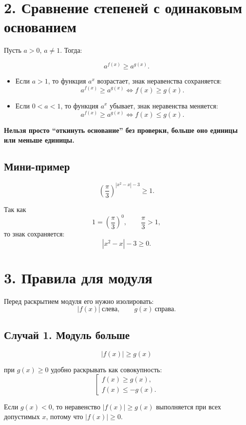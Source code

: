 \documentclass[a4paper,12pt]{article}
\newcommand{\sectionline}{\vspace{2mm}{\color{accent}\hrule height 0.6pt}\vspace{2mm}}
\newcommand{\important}[1]{\textcolor{darkaccent}{\textbf{#1}}}
\begin{document}
\section*{2. Сравнение степеней с одинаковым основанием}
\sectionline

Пусть \(a>0\), \(a\ne 1\). Тогда:

\[
a^{f(x)} \ge a^{g(x)}.
\]

\begin{itemize}
    \item Если \(a>1\), то функция \(a^x\) возрастает, знак неравенства сохраняется:
    \[
    a^{f(x)} \ge a^{g(x)} \Longleftrightarrow f(x)\ge g(x).
    \]
    \item Если \(0<a<1\), то функция \(a^x\) убывает, знак неравенства меняется:
    \[
    a^{f(x)} \ge a^{g(x)} \Longleftrightarrow f(x)\le g(x).
    \]
\end{itemize}

\important{Нельзя просто ``откинуть основание'' без проверки, больше оно единицы или меньше единицы.}

\subsection*{Мини-пример}

\[
\left(\frac{\pi}{3}\right)^{|x^2-x|-3}\ge 1.
\]

Так как
\[
1=\left(\frac{\pi}{3}\right)^0,\qquad \frac{\pi}{3}>1,
\]
то знак сохраняется:
\[
|x^2-x|-3\ge 0.
\]

\section*{3. Правила для модуля}
\sectionline

Перед раскрытием модуля его нужно изолировать:
\[
|f(x)| \ \text{слева},\qquad g(x)\ \text{справа}.
\]

\subsection*{Случай 1. Модуль больше}

\[
|f(x)|\ge g(x)
\]

при \(g(x)\ge 0\) удобно раскрывать как совокупность:
\[
\left[
\begin{array}{l}
f(x)\ge g(x),\\
f(x)\le -g(x).
\end{array}
\right.
\]

Если \(g(x)<0\), то неравенство \(|f(x)|\ge g(x)\) выполняется при всех допустимых \(x\), потому что \(|f(x)|\ge 0\).
\end{document}
